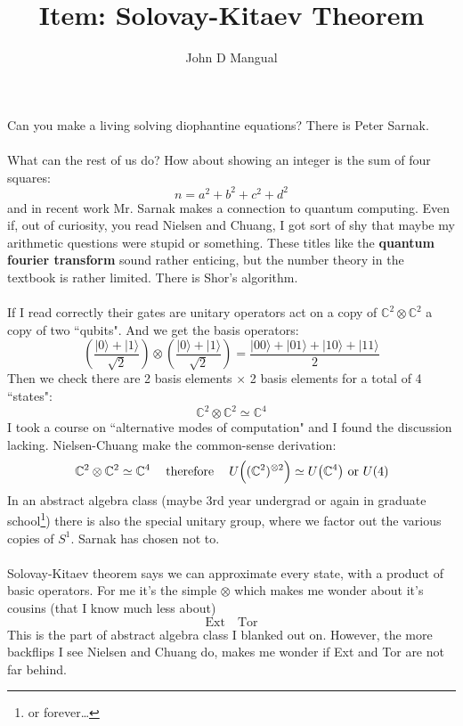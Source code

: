 \documentclass[12pt]{article}
\title{Item: \textbf{Solovay-Kitaev Theorem}}
\author{John D Mangual}
\date{}
\begin{document}
\selectfont \fontsize{12.5}{15}\selectfont

\maketitle

\noindent Can you make a living solving diophantine equations?  There is Peter Sarnak. \\ \\
What can the rest of us do?  How about showing an integer is the sum of four squares:
$$ n = a^2 + b^2 + c^2 + d^2 $$
and in recent work Mr. Sarnak makes a connection to quantum computing.  Even if, out of curiosity, you read Nielsen and Chuang, I got sort of shy that maybe my arithmetic questions were stupid or something. These titles like the \textbf{quantum fourier transform} sound rather enticing, but the number theory in the textbook is rather limited.  There is Shor's algorithm.\\ \\
If I read correctly their gates are unitary operators act on a copy of $\mathbb{C}^2 \otimes \mathbb{C}^2$ a copy of two ``qubits".  And we get the basis operators:
$$ 
\left( \frac{ | 0 \rangle + | 1 \rangle  }{\sqrt{2}} \right) \otimes 
\left( \frac{ | 0 \rangle + | 1 \rangle  }{\sqrt{2}} \right) = 
\frac{ | 00 \rangle + | 01 \rangle + | 10 \rangle + | 11 \rangle}{2}$$
Then we check there are 2 basis elements $\times$ 2 basis elements for a total of 4 ``states":
$$ \mathbb{C}^2 \otimes \mathbb{C}^2 \simeq \mathbb{C}^4 $$
I took a course on ``alternative modes of computation" and I found the discussion lacking.  Nielsen-Chuang make the common-sense derivation:
$$ \mathbb{C}^2 \otimes \mathbb{C}^2 \simeq \mathbb{C}^4 \hspace{0.125in}\text{ therefore }\hspace{0.125in} U \Big((\mathbb{C}^2)^{\otimes 2}\Big) \simeq U \big(\mathbb{C}^4\big) \text{ or }U(4) $$
In an abstract algebra class (maybe 3rd year undergrad or again in graduate school\footnote{or forever\dots}) there is also the special unitary group, where we factor out the various copies of $S^1$.  Sarnak has chosen not to. \\ \\
Solovay-Kitaev theorem says we can approximate every state, with a product of basic operators.  For me it's the simple $\otimes$ which makes me wonder about it's cousins (that I know much less about)
$$ \text{Ext}\quad \text{Tor}  $$
This is the part of abstract algebra class I blanked out on.  However, the more backflips I see Nielsen and Chuang do, makes me wonder if Ext and Tor are not far behind.
\end{document}
